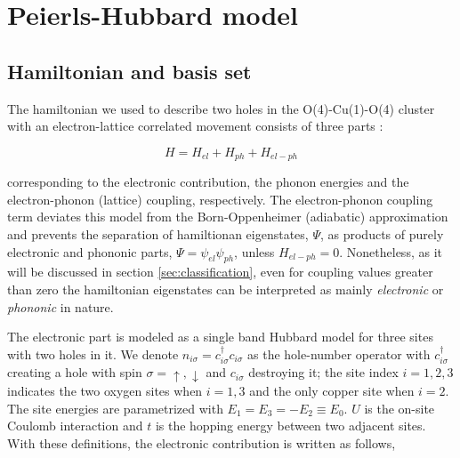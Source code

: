 \chapter{Peierls-Hubbard model}
\label{chap:model}



\section{Hamiltonian and basis set}
\label{sec:hamiltonian-and-basis}

The hamiltonian we used to describe two holes in the O(4)-Cu(1)-O(4) cluster with an electron-lattice correlated movement consists of three parts \cite{Salkola1994}:

\begin{equation}\label{eq:full-hamiltonian}
H = H_{el} + H_{ph} + H_{el-ph}
\end{equation}

\noindent corresponding to the electronic contribution, the phonon energies and the electron-phonon (lattice) coupling, respectively. 
The electron-phonon coupling term deviates this model from the Born-Oppenheimer (adiabatic) approximation and prevents the separation of hamiltionan eigenstates, $\Psi$, as products of purely electronic and phononic parts, $\Psi=\psi_{el}\psi_{ph}$, unless $H_{el-ph}=0$.
Nonetheless, as it will be discussed in section \ref{sec:classification}, even for coupling values greater than zero the hamiltonian eigenstates can be interpreted as mainly \textit{electronic} or \textit{phononic} in nature.

The electronic part is modeled as a single band Hubbard model for three sites with two holes in it. 
We denote $n_{i\sigma}=c_{i\sigma}^\dagger c_{i\sigma}$ as the hole-number operator with $c_{i\sigma}^\dagger$ creating a hole with spin $\sigma = \uparrow, \downarrow$ and $c_{i\sigma}$ destroying it; the site index $i=1,2,3$ indicates the two oxygen sites when  $i=1,3$ and the only copper site when $i=2$. 
The site energies are parametrized with $E_1=E_3=-E_2 \equiv E_0$. 
$U$ is the on-site Coulomb interaction and $t$ is the hopping energy between two adjacent sites. 
With these definitions, the electronic contribution is written as follows,

